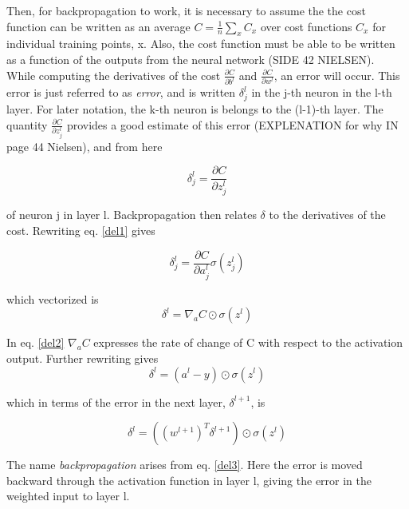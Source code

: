 \documentclass[a4paper,11pt,twocolumn]{article}
\begin{document}
Then, for backpropagation to work, it is necessary to assume the the cost function can be written as an average $C = \frac{1}{n}\sum_x C_x$ over cost functions $C_x$ for individual training points, x. Also, the cost function must be able to be written as a function of the outputs from the neural network (SIDE 42 NIELSEN). 
\\

While computing the  derivatives of the cost $\frac{\partial C}{\partial b^l}$ and $\frac{\partial C}{\partial w^l}$, an error will occur. This error is just referred to as \textit{error}, and is written $\delta_j^l$ in the j-th neuron in the l-th layer. For later notation, the k-th neuron is belongs to the (l-1)-th layer. The quantity $\frac{\partial C}{\partial z_j^l}$ provides a good estimate of this error (EXPLENATION for why IN page 44 Nielsen), and from here 

\begin{equation}
\delta_j^l = \frac{\partial C}{\partial z_j^l}
\label{del1}
\end{equation}

of neuron j in layer l. Backpropagation then relates $\delta$ to the derivatives of the cost. Rewriting eq. \eqref{del1} gives

\begin{equation}
\delta_j^l = \frac{\partial C}{\partial a_j^l} \sigma(z_j^l)
\label{del2}
\end{equation}

which vectorized is 
\begin{equation}
\delta^l = \nabla_aC \odot\sigma(z^l)
\label{del2}
\end{equation}

In eq. \eqref{del2} $\nabla_aC$ expresses the rate of change of C with respect to the activation output. Further rewriting gives 
\begin{equation}
\delta^l = (a^l - y)\odot \sigma(z^l)
\end{equation}

which in terms of the error in the next layer, $\delta^{l+1}$, is

\begin{equation}
\delta^l = ((w^{l+1})^T\delta^{l+1})\odot \sigma(z^l)
\label{del3}
\end{equation}

The name \textit{backpropagation} arises from eq. \eqref{del3}.  Here the error is moved backward through the activation function in layer l, giving the error in the weighted input to layer l. 
\end{document}
